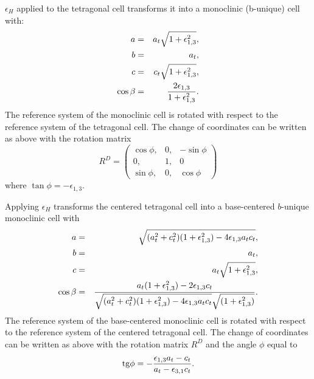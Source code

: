 \documentclass[12pt,a4paper]{article}
\begin{document}
$\epsilon_H$ applied to the tetragonal cell transforms it into a 
monoclinic (b-unique) cell with:
\begin{eqnarray}
a&=&a_t \sqrt{1+\epsilon_{1,3}^2}, \\
b&=&a_t, \\
c&=&c_t \sqrt{1+\epsilon_{1,3}^2}, \\
\cos\beta &=& {2 \epsilon_{1,3} \over 1 + \epsilon_{1,3}^2}.
\end{eqnarray}
The reference system of the monoclinic cell is rotated with respect to
the reference system of the tetragonal cell. 
The change of coordinates can be written as above with the rotation matrix 
\begin{equation}
R^D=\left( \begin{array}{ccc}
\cos\phi, & 0, & -\sin\phi \\
0, & 1, & 0 \\
\sin\phi, & 0, & \cos\phi  
\end{array}
\right)
\end{equation}
where $\tan \phi=-\epsilon_{1,3}$.

Applying $\epsilon_H$ transforms the centered tetragonal cell into 
a base-centered $b$-unique monoclinic cell with
\begin{eqnarray}
a&=&\sqrt{(a_t^2+c_t^2)(1+\epsilon_{1,3}^2)-4\epsilon_{1,3}a_tc_t}, \\
b&=&a_t, \\
c&=&a_t \sqrt{1+\epsilon_{1,3}^2}, \\
\cos\beta &=& {a_t (1+\epsilon_{1,3}^2) -2 \epsilon_{1,3} c_t \over 
\sqrt{(a_t^2+c_t^2)(1+\epsilon_{1,3}^2)-4\epsilon_{1,3}a_tc_t} 
\sqrt{(1+\epsilon_{1,3}^2)}}.
\end{eqnarray}
The reference system of the base-centered monoclinic cell is rotated with 
respect to the reference system of the centered tetragonal cell. 
The change of coordinates can be written as above with the rotation matrix 
$R^D$ and the angle $\phi$ equal to
\begin{equation}
{\rm tg} \phi = -{\epsilon_{1,3} a_t - c_t \over a_t - \epsilon_{3,1} c_t}.
\end{equation}
\end{document}

